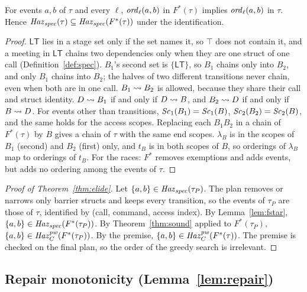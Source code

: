 \begin{lemma}[Conservativity of $F^*$]\label{lem:fstar}
For events $a,b$ of $\tau$ and every $\ell$, $\mathit{ord}_{\ell}(a,b)$ in $F^*(\tau)$ implies $\mathit{ord}_{\ell}(a,b)$ in $\tau$.
Hence $\mathit{Haz}_{\mathit{spec}}(\tau) \subseteq \mathit{Haz}_{\mathit{spec}}(F^*(\tau))$ under the identification.
\end{lemma}
\begin{proof}
$\mathsf{LT}$ lies in a stage set only if the set names it, so $\top$ does not contain it, and a meeting in
$\mathsf{LT}$ chains two dependencies only when they are one struct of one call (Definition~\ref{def:spec}). $B_1$'s
second set is $\{\mathsf{LT}\}$, so $B_1$ chains only into $B_2$, and only $B_1$ chains into $B_2$; the halves of two
different transitions never chain, even when both are in one call. $B_1 \rightsquigarrow B_2$ is allowed, because they share
their call and struct identity. $D \rightsquigarrow B_1$ if and only if $D \rightsquigarrow B$, and $B_2 \rightsquigarrow D$ if and only if $B \rightsquigarrow D$.
For events other than transitions, $\mathit{Sc}_{1}(B_1) = \mathit{Sc}_{1}(B)$, $\mathit{Sc}_{2}(B_2) = \mathit{Sc}_{2}(B)$, and the same holds for the
access scopes. Replacing each $B_1 B_2$ in a chain of $F^*(\tau)$ by $B$ gives a chain of $\tau$ with the same end
scopes. $\lambda_B$ is in the scopes of $B_1$ (second) and $B_2$ (first) only, and $t_B$ is in both scopes of $B$, so
orderings of $\lambda_B$ map to orderings of $t_B$. For the races: $F^*$ removes exemptions and adds events, but adds
no ordering among the events of $\tau$.
\end{proof}

\begin{proof}[Proof of Theorem~\ref{thm:elide}]
Let $\{a,b\} \in \mathit{Haz}_{\mathit{spec}}(\tau_P)$. The plan removes or narrows only barrier structs and keeps every transition, so the
events of $\tau_P$ are those of $\tau$, identified by (call, command, access index). By Lemma~\ref{lem:fstar},
$\{a,b\} \in \mathit{Haz}_{\mathit{spec}}(F^*(\tau_P))$. By Theorem~\ref{thm:sound} applied to $F^*(\tau_P)$, $\{a,b\} \in
\mathit{Haz}_C^{\mathit{pw}}(F^*(\tau_P))$. By the premise, $\{a,b\} \in \mathit{Haz}_C^{\mathit{pw}}(F^*(\tau))$. The premise is checked on the final plan, so the
order of the greedy search is irrelevant.
\end{proof}


\subsection{Repair monotonicity (Lemma~\ref{lem:repair})}
\label{app:repair}

